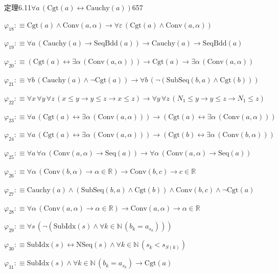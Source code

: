 \begin{fullproof}{定理6.11}{$\forall a\,(\mathrm{Cgt}(a) \leftrightarrow \mathrm{Cauchy}(a))$}{657}
\begin{abbrevlist}
\item $\varphi_{18} :\equiv \mathrm{Cgt}(a) \land \mathrm{Conv}(a,\alpha) \to \forall \varepsilon\,(\mathrm{Cgt}(a) \land \mathrm{Conv}(a,\alpha))$
\item $\varphi_{19} :\equiv \forall a\,(\mathrm{Cauchy}(a) \to \mathrm{SeqBdd}(a)) \to \mathrm{Cauchy}(a) \to \mathrm{SeqBdd}(a)$
\item $\varphi_{20} :\equiv (\mathrm{Cgt}(a) \leftrightarrow \exists \alpha\,(\mathrm{Conv}(a,\alpha))) \to \mathrm{Cgt}(a) \to \exists \alpha\,(\mathrm{Conv}(a,\alpha))$
\item $\varphi_{21} :\equiv \forall b\,(\mathrm{Cauchy}(a) \land \neg \mathrm{Cgt}(a)) \to \forall b\,(\neg (\mathrm{SubSeq}(b,a) \land \mathrm{Cgt}(b)))$
\item $\varphi_{22} :\equiv \forall x\,\forall y\,\forall z\,(x \leq y \to y \leq z \to x \leq z) \to \forall y\,\forall z\,(N_{1} \leq y \to y \leq z \to N_{1} \leq z)$
\item $\varphi_{23} :\equiv \forall a\,(\mathrm{Cgt}(a) \leftrightarrow \exists \alpha\,(\mathrm{Conv}(a,\alpha))) \to (\mathrm{Cgt}(a) \leftrightarrow \exists \alpha\,(\mathrm{Conv}(a,\alpha)))$
\item $\varphi_{24} :\equiv \forall a\,(\mathrm{Cgt}(a) \leftrightarrow \exists \alpha\,(\mathrm{Conv}(a,\alpha))) \to (\mathrm{Cgt}(b) \leftrightarrow \exists \alpha\,(\mathrm{Conv}(b,\alpha)))$
\item $\varphi_{25} :\equiv \forall a\,\forall \alpha\,(\mathrm{Conv}(a,\alpha) \to \mathrm{Seq}(a)) \to \forall \alpha\,(\mathrm{Conv}(a,\alpha) \to \mathrm{Seq}(a))$
\item $\varphi_{26} :\equiv \forall \alpha\,(\mathrm{Conv}(b,\alpha) \to \alpha \in \mathbb{R}) \to \mathrm{Conv}(b,c) \to c \in \mathbb{R}$
\item $\varphi_{27} :\equiv \mathrm{Cauchy}(a) \land (\mathrm{SubSeq}(b,a) \land \mathrm{Cgt}(b)) \land \mathrm{Conv}(b,c) \land \neg \mathrm{Cgt}(a)$
\item $\varphi_{28} :\equiv \forall \alpha\,(\mathrm{Conv}(a,\alpha) \to \alpha \in \mathbb{R}) \to \mathrm{Conv}(a,\alpha) \to \alpha \in \mathbb{R}$
\item $\varphi_{29} :\equiv \forall s\,(\neg (\mathrm{SubIdx}(s) \land \forall k \in \mathbb{N}\,(b_{k} = a_{s_{k}})))$
\item $\varphi_{30} :\equiv \mathrm{SubIdx}(s) \leftrightarrow \mathrm{NSeq}(s) \land \forall k \in \mathbb{N}\,(s_{k} < s_{S(k)})$
\item $\varphi_{31} :\equiv \mathrm{SubIdx}(s) \land \forall k \in \mathbb{N}\,(b_{k} = a_{s_{k}}) \to \mathrm{Cgt}(a)$

\end{abbrevlist}
\end{fullproof}

